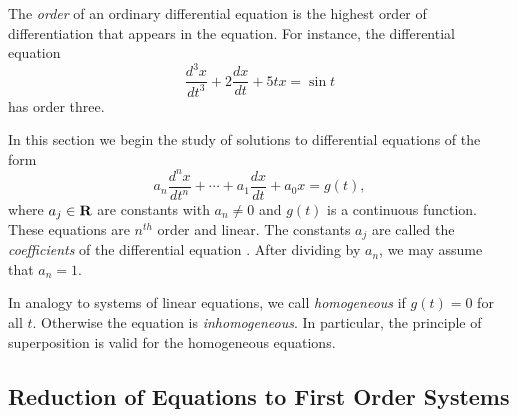 \label{sec:HighOrder}

The {\em order\/} of an ordinary differential equation is the highest 
order of differentiation that appears in the equation.  For instance, 
the differential equation  
\[
\frac{d^3x}{dt^3} + 2\frac{dx}{dt}+ 5tx = \sin t
\]
has order three. 

In this section we begin the study of solutions to differential equations 
of the form
\begin{equation}  \label{eq:nconst}
a_n\frac{d^nx}{dt^n} + \cdots + a_1\frac{dx}{dt}+a_0x = g(t),
\end{equation}
where $a_j\in\mbox{$\bf{R}$}$ are constants with $a_n\neq 0$ and $g(t)$ is a 
continuous function. These equations are $n^{th}$ order and linear. 
The constants $a_j$ are called the 
{\em coefficients\/} of the 
differential equation .  After dividing  by 
$a_n$, we may assume that $a_n=1$.  

In analogy to systems of linear equations, we call  
{\em homogeneous\/} if $g(t)=0$ for all $t$.  Otherwise the equation is 
{\em inhomogeneous}.   In particular, the principle of superposition is 
valid for the homogeneous equations.    

\subsection*{Reduction of Equations to First Order Systems}

